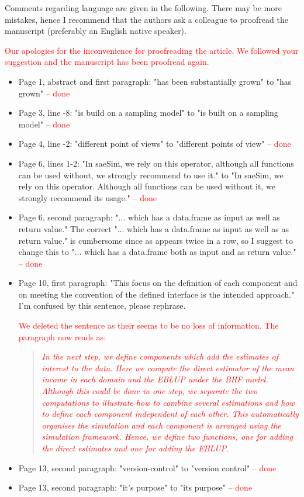 \documentclass[11pt]{article}
\begin{document}
\vspace{0.5cm}

\noindent Comments regarding language are given in the following. There may be more mistakes, hence I recommend that the authors ask a colleague to proofread the manuscript (preferably an English native speaker).

\noindent\textcolor{red}{Our apologies for the inconvenience for proofreading the article. We followed your suggestion and the manuscript has been proofread again.}

\begin{itemize}
\item
	Page 1, abstract and first paragraph: "has been substantially grown" to "has grown" \textcolor{red}{-- done}
\item
	Page 3, line -8: "is build on a sampling model" to "is built on a sampling model" \textcolor{red}{-- done}
\item
	Page 4, line -2: "different point of views" to "different points of view" \textcolor{red}{-- done}
\item
	Page 6, lines 1-2: "In saeSim, we rely on this operator, although all functions can be used without, we strongly recommend to use it." to "In saeSim, we rely on this operator. Although all functions can be used without it, we strongly recommend its usage." \textcolor{red}{-- done}
\item
	Page 6, second paragraph: "... which has a data.frame as input as well as return value." The correct "... which has a data.frame as input as well as as return value." is cumbersome since as appears twice in a row, so I suggest to change this to "... which has a data.frame both as input and as return value."  \textcolor{red}{-- done}

\item
	Page 10, first paragraph: "This focus on the definition of each component and on meeting the convention of the defined interface is the intended approach." I'm confused by this sentence, please rephrase. 
	
	\textcolor{red}{We deleted the sentence as their seems to be no loss of information. The paragraph now reads as:}	
	\begin{quote}
	\textit{
	\textcolor{red}{
		In the next step, we define components which add the estimates of interest to the data. Here we compute the direct estimator of the mean income in each domain and the EBLUP under the BHF model. Although this could be done in one step, we separate the two computations to illustrate how to combine several estimations and how to define each component independent of each other. This automatically organises the simulation and each component is arranged using the simulation framework. Hence, we define two functions, one for adding the direct estimates and one for adding the EBLUP.
		}
		}
	\end{quote}
\item
	Page 13, second paragraph: "version-control" to "version control" \textcolor{red}{-- done}
\item
	Page 13, second paragraph: "it's purpose" to "its purpose" \textcolor{red}{-- done}
\end{itemize}
\end{document}
